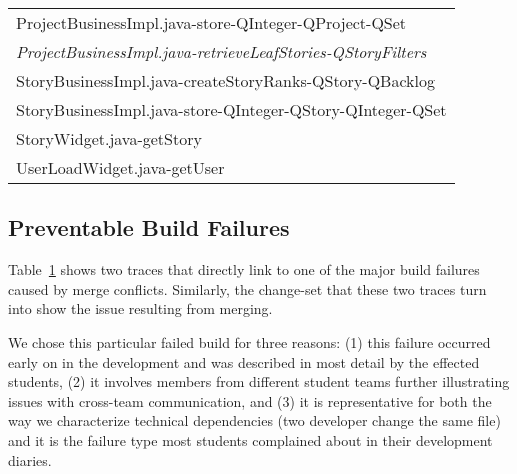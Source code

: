 \begin{table}[t!]
\begin{tabular}{@{\hspace{2pt}}l@{\hspace{2pt}}}
     ProjectBusinessImpl.java-store-QInteger-QProject-QSet        \\%
     \emph{ProjectBusinessImpl.java-retrieveLeafStories-QStoryFilters}                                 \\%
     StoryBusinessImpl.java-createStoryRanks-QStory-QBacklog                     \\%
     StoryBusinessImpl.java-store-QInteger-QStory-QInteger-QSet  \\%
     StoryWidget.java-getStory                                                       \\%
     UserLoadWidget.java-getUser                                                     \\%
      \bottomrule
\end{tabular}
\label{tab:overlappingtraces}
\end{table}

\subsection{Preventable Build Failures}
Table~\ref{tab:overlappingtraces} shows two traces that directly link to one of the major build failures caused by merge conflicts.
Similarly, the change-set that these two traces turn into show the issue resulting from merging.

We chose this particular failed build for three reasons:
(1) this failure occurred early on in the development and was described in most detail by the effected students,
(2) it involves members from different student teams further illustrating issues with cross-team communication,
and (3) it is representative for both the way we characterize technical dependencies (two developer change the same file) and it is the failure type most students complained about in their development diaries.


